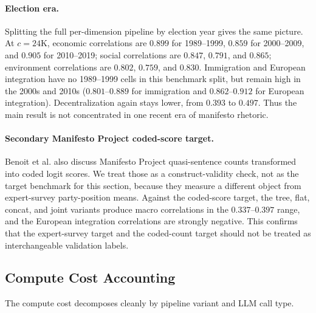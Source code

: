 \paragraph{Election era.} Splitting the full per-dimension pipeline by
election year gives the same picture. At $c = 24\mathrm{K}$, economic
correlations are $0.899$ for 1989--1999, $0.859$ for 2000--2009, and
$0.905$ for 2010--2019; social correlations are $0.847$, $0.791$, and
$0.865$; environment correlations are $0.802$, $0.759$, and $0.830$.
Immigration and European integration have no 1989--1999 cells in this
benchmark split, but remain high in the 2000s and 2010s
($0.801$--$0.889$ for immigration and $0.862$--$0.912$ for European
integration). Decentralization again stays lower, from $0.393$ to
$0.497$. Thus the main result is not concentrated in one recent era of
manifesto rhetoric.

\paragraph{Secondary Manifesto Project coded-score target.} Benoit et
al. also discuss Manifesto Project quasi-sentence counts transformed
into coded logit scores. We treat those as a construct-validity check,
not as the target benchmark for this section, because they measure a
different object from expert-survey party-position means. Against the
coded-score target, the tree, flat, concat, and joint variants produce
macro correlations in the $0.337$--$0.397$ range, and the European
integration correlations are strongly negative. This confirms that the
expert-survey target and the coded-count target should not be treated as
interchangeable validation labels.

\subsection{Compute Cost Accounting}

The compute cost decomposes cleanly by pipeline variant and LLM call
type.


